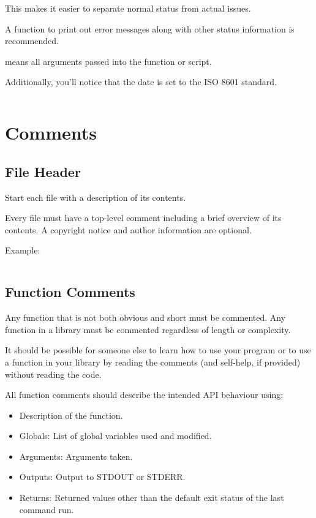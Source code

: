 \documentclass{article}
\begin{document}
This makes it easier to separate normal status from actual issues.

A function to print out error messages along with other status information is recommended.

\code{\$*} means all arguments passed into the function or script.

Additionally, you'll notice that the date is set to the ISO 8601 standard.

\inputminted[frame=single,firstline=5, lastline=12,linenos]{bash}{./styleguide.bash}

\section{Comments}
\label{sec:comms}
\subsection{File Header}
\label{subsec:file_header}
Start each file with a description of its contents.

Every file must have a top-level comment including a brief overview of its contents. A copyright notice and author information are optional.

Example:
\inputminted[frame=single,firstline=1, lastline=3,linenos]{bash}{./styleguide.bash}

\subsection{Function Comments}
\label{subsec:func_comms}
Any function that is not both obvious and short must be commented. Any function in a library must be commented regardless of length or complexity.

It should be possible for someone else to learn how to use your program or to use a function in your library by reading the comments (and self-help, if provided) without reading the code.

All function comments should describe the intended API behaviour using:
\begin{itemize}
    \item Description of the function.
    \item Globals: List of global variables used and modified.
    \item Arguments: Arguments taken.
    \item Outputs: Output to STDOUT or STDERR.
    \item Returns: Returned values other than the default exit status of the last command run.
\end{itemize}
\end{document}
